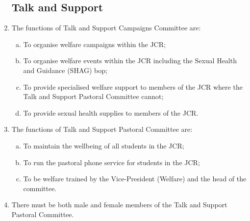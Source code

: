 \documentclass[12pt]{article}  %
\begin{document}
\begin{enumerate}
    \subsection{Talk and Support}
    \item The functions of Talk and Support Campaigns Committee are:
    \begin{enumerate}[(a)]
        \item To organise welfare campaigns within the JCR;
        \item To organise welfare events within the JCR including the Sexual Health and Guidance (SHAG) bop;
        \item To provide specialised welfare support to members of the JCR where the Talk and Support Pastoral Committee cannot;
        \item To provide sexual health supplies to members of the JCR.
    \end{enumerate}
    \item The functions of Talk and Support Pastoral Committee are:
    \begin{enumerate}[(a)]
        \item To maintain the wellbeing of all students in the JCR;
        \item To run the pastoral phone service for students in the JCR;
        \item To be welfare trained by the Vice-President (Welfare) and the head of the committee.
    \end{enumerate}
    \item There must be both male and female members of the Talk and Support Pastoral Committee.

\end{enumerate}
\end{document}

